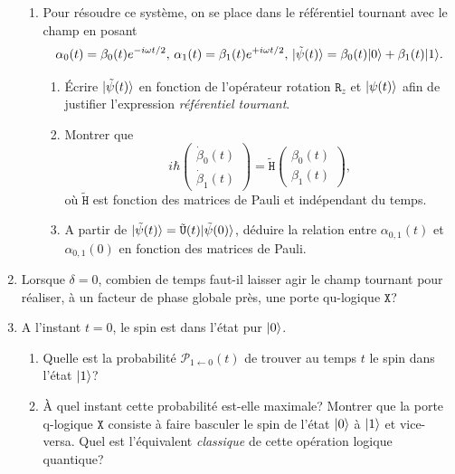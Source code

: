 \begin{enumerate}
\begin{enumerate}
\item Pour résoudre ce système, on se place dans le référentiel tournant avec le
champ en posant
\begin{equation}
\alpha_0(t)=\beta_0(t)e^{-i\omega t/2},\,\alpha_1(t)=\beta_1(t)e^{+i\omega
t/2},\,\vert\tilde{\psi}(t)\rangle=\beta_0(t)\vert0\rangle+\beta_1(t)\vert1\rangle.
\end{equation}

\begin{enumerate}
\item Écrire $\vert\tilde{\psi}(t)\rangle$ en fonction de l'opérateur rotation
$\mathtt{R}_z$ et $\vert\psi(t)\rangle$ afin de justifier l'expression
\emph{référentiel tournant}.
\item Montrer que
\begin{equation}
i\hbar\begin{pmatrix}\dot{\beta}_0(t)\\\dot{\beta}_1(t)\end{pmatrix}
=\tilde{\mathtt{H}}\begin{pmatrix}\beta_0(t)\\\beta_1(t)\end{pmatrix},
\end{equation}
où $\tilde{\mathtt{H}}$ est fonction des matrices de Pauli et indépendant du
temps.

\item A partir de $\vert\tilde{\psi}(t)\rangle=\tilde{\mathtt{U}}(t)
\vert\tilde{\psi}(0)\rangle$, déduire la relation entre $\alpha_{0,1}(t)$ et
$\alpha_{0,1}(0)$ en fonction des matrices de Pauli.
\end{enumerate}
\end{enumerate}

\item Lorsque $\delta=0$, combien de temps faut-il laisser agir le champ
tournant pour réaliser, à un facteur de phase globale près, une porte qu-logique
$\mathtt{X}$?

\item A l'instant $t=0$, le spin est dans l'état pur $\vert0\rangle$.

\begin{enumerate}
\item Quelle est la probabilité $\mathcal{P}_{1\leftarrow0}(t)$ de trouver au
temps $t$ le spin dans l'état $\vert1\rangle$?

\item À quel instant cette probabilité est-elle maximale? Montrer que la porte
q-logique $\mathtt{X}$ consiste à faire basculer le spin de l'état $\vert0\rangle$ à
$\vert1\rangle$ et vice-versa. Quel est l'équivalent \emph{classique} de cette
opération logique quantique?
\end{enumerate}
\end{enumerate}

